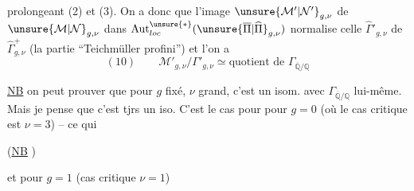 
prolongeant (2) et (3). On a donc que l'image $\unsure{\mathcal M'|\mathcal N'}_{g,\nu}$ de $\unsure{\mathcal M|\mathcal N}_{g,\nu}$ dans $\operatorname{Aut}^{\unsure{*}}_{loc}(\unsure{\overline\Pi|\widehat\Pi}_{g,\nu})$ normalise celle $\widehat\Gamma'_{g,\nu}$ de $\widehat\Gamma^+_{g,\nu}$ (la partie ``Teichmüller profini'') et l'on a
\[
(10)\qquad \mathcal M'_{g,\nu}/\Gamma'_{g,\nu}\simeq\text{quotient de }\Gamma_{\overline{\mathbb Q}/\mathbb Q}
\]

\uline{NB} on peut prouver que pour $g$ fixé, $\nu$ grand, c'est un isom. avec $\Gamma_{\overline{\mathbb Q}/\mathbb Q}$ lui-même. Mais je pense que c'est tjrs un iso.  C'est le cas pour pour $g=0$ (où le cas critique est $\nu=3$) -- ce qui  

(\uline{NB}
)

et pour $g=1$ (cas critique $\nu=1$)

